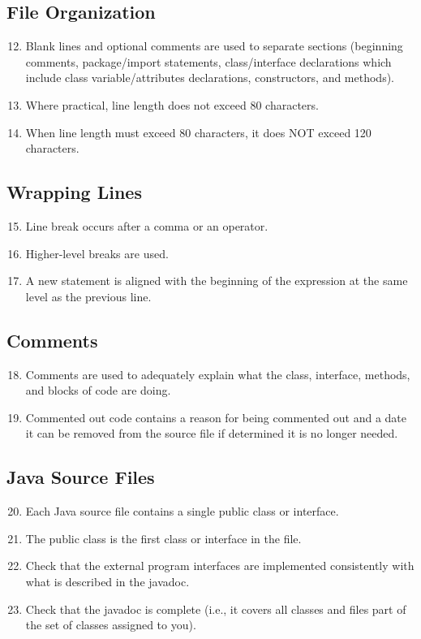 	\subsection{File Organization}
	\begin{enumerate}
		\setcounter{enumi}{11}
		\item Blank lines and optional comments are used to separate sections (beginning comments, package/import statements, class/interface declarations which include class variable/attributes declarations, constructors, and methods).
		\item Where practical, line length does not exceed 80 characters.
		\item When line length must exceed 80 characters, it does NOT exceed 120 characters.
	\end{enumerate}
	\subsection{Wrapping Lines}
	\begin{enumerate}
		\setcounter{enumi}{14}
		\item Line break occurs after a comma or an operator.
		\item Higher-level breaks are used.
		\item A new statement is aligned with the beginning of the expression at the same level as the previous line.
	\end{enumerate}
	\subsection{Comments}
	\begin{enumerate}
		\setcounter{enumi}{17}
		\item Comments are used to adequately explain what the class, interface, methods, and blocks of code are doing.
		\item Commented out code contains a reason for being commented out and a date it can be removed from the source file if determined it is no longer needed.
	\end{enumerate}
	\subsection{Java Source Files}
	\begin{enumerate}
		\setcounter{enumi}{19}
		\item Each Java source file contains a single public class or interface.
		\item The public class is the first class or interface in the file.
		\item Check that the external program interfaces are implemented consistently with what is described in the javadoc.
		\item Check that the javadoc is complete (i.e., it covers all classes and files part of the set of classes assigned to you).
	\end{enumerate}
